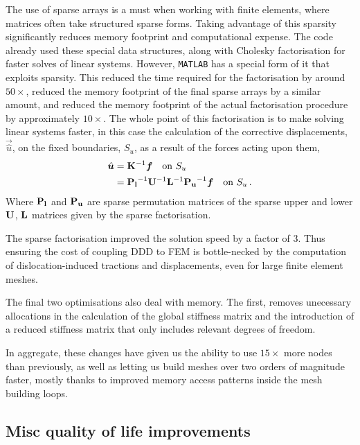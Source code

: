 The use of sparse arrays is a must when working with finite elements, where matrices often take structured sparse forms. Taking advantage of this sparsity significantly reduces memory footprint and computational expense. The code already used these special data structures, along with Cholesky factorisation for faster solves of linear systems. However, \texttt{MATLAB} has a special form of it that exploits sparsity. This reduced the time required for the factorisation by around $50\times$, reduced the memory footprint of the final sparse arrays by a similar amount, and reduced the memory footprint of the actual factorisation procedure by approximately $10 \times$. The whole point of this factorisation is to make solving linear systems faster, in this case the calculation of the corrective displacements, $\vec{\hat{u}}$, on the fixed boundaries, $S_u$, as a result of the forces acting upon them,
\begin{align}
    \vec{\hat{u}} & = \mtx{K}^{-1} \vec{f}\quad \text{on } S_u                                               \\
                  & = \mtx{P_l}^{-1} \mtx{U}^{-1} \mtx{L}^{-1} \mtx{P_u}^{-1} \vec{f}\quad \text{on } S_u\,.
\end{align}
Where $\mathbf{P_l}$ and $\mathbf{P_u}$ are sparse permutation matrices of the sparse upper and lower $\mathbf{U}$, $\mathbf{L}$ matrices given by the sparse factorisation.

The sparse factorisation improved the solution speed by a factor of 3. Thus ensuring the cost of coupling DDD to FEM is bottle-necked by the computation of dislocation-induced tractions and displacements, even for large finite element meshes.

The final two optimisations also deal with memory. The first, removes unecessary allocations in the calculation of the global stiffness matrix and the introduction of a reduced stiffness matrix that only includes relevant degrees of freedom.

In aggregate, these changes have given us the ability to use $15 \times$ more nodes than previously, as well as letting us build meshes over two orders of magnitude faster, mostly thanks to improved memory access patterns inside the mesh building loops.

\subsection{Misc quality of life improvements}\label{ss:qol}

